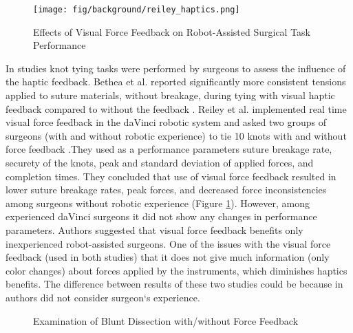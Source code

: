 \begin{figure}[h]
	\begin{center}
	\texttt{[image: fig/background/reiley\_haptics.png]}
	\end{center}
	\vspace{-4mm}
	\caption[Effects of Visual Force Feedback on Robot-Assisted Surgical Task Performance]
	{Effects of Visual Force Feedback on Robot-Assisted Surgical Task Performance \cite{reiley_effects_2008}}
	\label{fig:hapt_imp}
	\vspace{-2mm}
\end{figure}

In \cite{bethea_application_2004, reiley_effects_2008} studies knot tying tasks were performed by surgeons to assess the influence of the haptic feedback. Bethea et al. reported significantly more consistent tensions applied to suture materials, without breakage, during tying with visual haptic feedback compared to without the feedback \cite{bethea_application_2004}. Reiley et al. implemented real time visual force feedback in the daVinci robotic system and asked two groups of surgeons (with and without robotic experience) to tie 10 knots with and without force feedback \cite{reiley_effects_2008}
.They used as a performance parameters suture breakage rate, securety of the knots, peak and standard deviation of applied forces, and completion times. They concluded that use of visual force feedback resulted in lower suture breakage rates, peak forces, and decreased force inconsistencies among surgeons without robotic experience (Figure \ref{fig:hapt_imp}). However, among experienced daVinci surgeons it did not show any changes in performance parameters. Authors suggested that visual force feedback benefits only inexperienced robot-assisted surgeons. One of the issues with the visual force feedback (used in both studies) that it does not give much information (only color changes) about forces applied by the instruments, which diminishes haptics benefits. The difference between results of these two studies could be because in \cite{bethea_application_2004} authors did not consider surgeon`s experience.


\begin{figure}[h]%
\centering
{}%
\qquad
{}%
\qquad
{}%
\caption[Examination of Blunt Dissection with/without Force Feedback]{Examination of Blunt Dissection with/without Force Feedback \cite{wagner_benefit_2007}}
\label{fig:blant_dissect}%
\end{figure}

